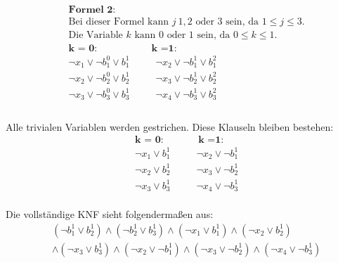 \documentclass[a4,abstract=on]{scrartcl}
\begin{document}
\begin{align*}
&\textbf{Formel 2:}\\
& \text{Bei dieser Formel kann } j {~} 1, 2 \text{ oder } 3 \text{ sein, da }1 \leq j \leq 3. \\
&\text{Die Variable } k \text{ kann } 0 \text{ oder } 1 \text{ sein, da } 0 \leq k \leq 1.\\
&\textbf{k = 0:} {~~~~~~~~~~~~~~~~~~~~~~~~~} \textbf{k =1:}\\
&\neg x_1 \vee \neg b_1^0 \vee b_1^1 {~~~~~~~~~~~~}\neg x_2 \vee \neg b_1^1 \vee b_1^2\\
&\neg x_2 \vee \neg b_2^0 \vee b_2^1 {~~~~~~~~~~~~} \neg x_3 \vee \neg b_2^1 \vee b_2^2\\
&\neg x_3 \vee \neg b_3^0 \vee b_3^1 {~~~~~~~~~~~~} \neg x_4 \vee \neg b_3^1 \vee b_3^2\\
\end{align*}
\ \\
Alle trivialen Variablen werden gestrichen. Diese Klauseln bleiben bestehen:\\
\begin{align*}
&\textbf{k = 0:} {~~~~~~~~~~~~~~~~}\textbf{k =1:}\\
&\neg x_1 \vee b_1^1{~~~~~~~~~~~~}\neg x_2 \vee \neg b_1^1 \\
&\neg x_2 \vee b_2^1{~~~~~~~~~~~~}\neg x_3 \vee \neg b_2^1 \\
&\neg x_3 \vee b_3^1{~~~~~~~~~~~~}\neg x_4 \vee \neg b_3^1 \\
\end{align*}

Die vollständige KNF sieht folgendermaßen aus:\\
\begin{align*}
&(\neg b_1^1 \vee b_2^1) \wedge (\neg b_2^1 \vee b_3^1) \wedge (\neg x_1 \vee b_1^1) \wedge (\neg x_2 \vee b_2^1)\\ &\wedge (\neg x_3 \vee b_3^1) \wedge (\neg x_2 \vee \neg b_1^1) \wedge (\neg x_3 \vee \neg b_2^1) \wedge (\neg x_4 \vee \neg b_3^1) \\
\end{align*}
\end{document}
